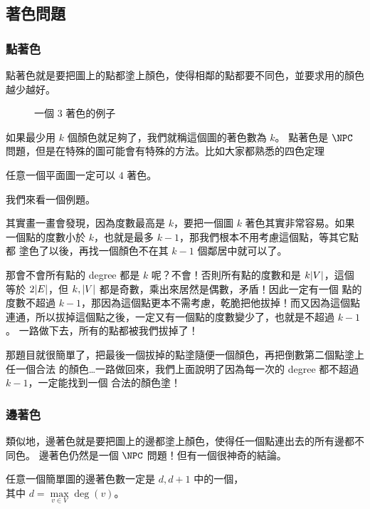 \documentclass[a4paper,12pt]{book}
\begin{document}
\subsection{著色問題}
\subsubsection{點著色}
點著色就是要把圖上的點都塗上顏色，使得相鄰的點都要不同色，並要求用的顏色越少越好。

\begin{figure}[H]
  \centering
  
  \caption{一個 $3$ 著色的例子}
\end{figure}

如果最少用 $k$ 個顏色就足夠了，我們就稱這個圖的著色數為 $k$。
點著色是 $\NPC$ 問題，但是在特殊的圖可能會有特殊的方法。比如大家都熟悉的四色定理

\begin{theorem}[四色定理]
  任意一個平面圖一定可以 $4$ 著色。
\end{theorem}

我們來看一個例題。

其實畫一畫會發現，因為度數最高是 $k$，要把一個圖 $k$ 著色其實非常容易。如果
一個點的度數小於 $k$，也就是最多 $k-1$，那我們根本不用考慮這個點，等其它點都
塗色了以後，再找一個顏色不在其 $k-1$ 個鄰居中就可以了。

那會不會所有點的 degree 都是 $k$ 呢？不會！否則所有點的度數和是 $k\lvert V \rvert$，這個
等於 $2 \lvert E \rvert$，但 $k, \lvert V \rvert$ 都是奇數，乘出來居然是偶數，矛盾！因此一定有一個
點的度數不超過 $k-1$，那因為這個點更本不需考慮，乾脆把他拔掉！而又因為這個點
連通，所以拔掉這個點之後，一定又有一個點的度數變少了，也就是不超過 $k-1$。
一路做下去，所有的點都被我們拔掉了！

那題目就很簡單了，把最後一個拔掉的點塗隨便一個顏色，再把倒數第二個點塗上任一個合法
的顏色…一路做回來，我們上面說明了因為每一次的 degree 都不超過 $k-1$，一定能找到一個
合法的顏色塗！

\subsubsection{邊著色}
類似地，邊著色就是要把圖上的邊都塗上顏色，使得任一個點連出去的所有邊都不同色。
邊著色仍然是一個 $\NPC$ 問題！但有一個很神奇的結論。

\begin{theorem}
  任意一個簡單圖的邊著色數一定是 $d, d+1$ 中的一個，\\
  其中 $d = \max\limits_{v \in V} \deg(v)$。
\end{theorem}
\end{document}
